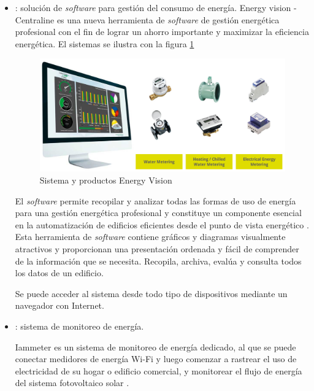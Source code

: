 \begin{itemize}
\item {}: solución de \emph{software} para gestión del consumo de energía. Energy vision - Centraline es una nueva herramienta de \emph{software} de gestión energética profesional con el fin de lograr un ahorro importante y maximizar la eficiencia energética. El sistemas se ilustra con la figura \ref{fig:energy-vision} 
\begin{figure}[htbp]
\centering
\includegraphics[width=.9\textwidth]{./Figures/energy-vision.jpg}
\caption{Sistema y productos Energy Vision \protect\footnotemark}
\label{fig:energy-vision}
\end{figure}



El \emph{software} permite recopilar y analizar todas las formas de uso de energía para una gestión energética profesional y constituye un componente esencial en la automatización de edificios eficientes desde el punto de vista energético \citep{WEBSITE:13}. Esta herramienta de \emph{software} contiene gráficos y diagramas visualmente atractivos y proporcionan una presentación ordenada y fácil de comprender de la información que se necesita. Recopila, archiva, evalúa y consulta todos los datos de un edificio. 

Se puede acceder al sistema desde todo tipo de dispositivos mediante un navegador con Internet.


\item {}: sistema de monitoreo de energía.

Iammeter es un sistema de monitoreo de energía dedicado, al que se puede conectar medidores de energía Wi-Fi y luego comenzar a rastrear el uso de electricidad de su hogar o edificio comercial, y monitorear el flujo de energía del sistema fotovoltaico solar \citep{WEBSITE:11}.


\end{itemize}
